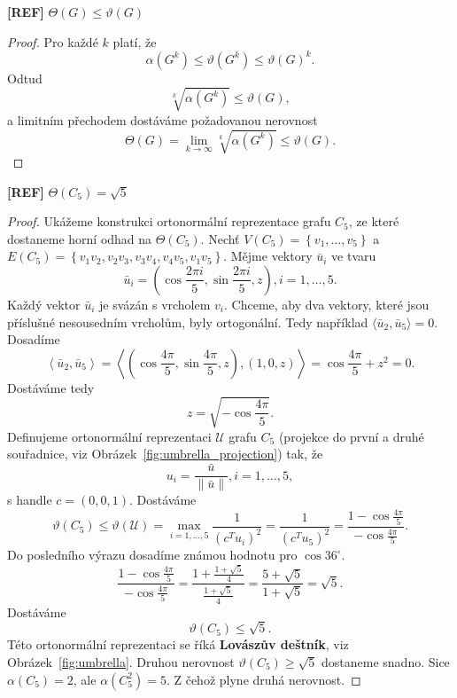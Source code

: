 \begin{lm}\textbf{[REF]}
    $\Theta(G) \leq \vartheta(G)$
\end{lm}

\begin{proof}
    Pro každé $k$ platí, že
    $$
        \alpha(G^k) \leq \vartheta(G^k) \leq \vartheta(G)^k.
    $$
    Odtud
    $$
        \sqrt[k]{\alpha(G^k)} \leq \vartheta(G),
    $$
    a limitním přechodem dostáváme požadovanou nerovnost
    $$
        \Theta(G) = \lim_{k \to \infty} \sqrt[k]{\alpha(G^k)} \leq \vartheta(G).
    $$
\end{proof}

\begin{vt}\textbf{[REF]}
    $\Theta(C_5) = \sqrt{5}$
\end{vt}

\begin{proof}
    Ukážeme konstrukci ortonormální reprezentace grafu $C_5$, ze které dostaneme horní odhad na $\Theta(C_5)$. Nechť $V(C_5) = \left\{ v_1, \dots, v_5 \right\}$ a $E(C_5) = \left\{ v_1v_2, v_2v_3, v_3v_4, v_4v_5, v_1v_5 \right\}$. Mějme vektory $\bar{u}_i$ ve tvaru
    $$
        \bar{u}_i = \left( \cos\frac{2 \pi i}{5}, \sin \frac{2 \pi i}{5}, z \right), i = 1, \dots, 5.
    $$
    Každý vektor $\bar{u}_i$ je svázán s vrcholem $v_i$. Chceme, aby dva vektory, které jsou příslušné nesousedním vrcholům, byly ortogonální. Tedy například $\langle \bar{u}_2, \bar{u}_5 \rangle = 0$. Dosadíme
    $$
        \left\langle \bar{u}_2, \bar{u}_5 \right\rangle = 
        \left\langle ( \cos\frac{4\pi}{5}, \sin\frac{4\pi}{5}, z ), \left( 1, 0, z \right) \right\rangle =
        \cos\frac{4\pi}{5} + z^2 = 0.
    $$
    Dostáváme tedy
    $$
        z = \sqrt{-\cos\frac{4\pi}{5}}.
    $$
    Definujeme ortonormální reprezentaci $\mathcal{U}$ grafu $C_5$ (projekce do první a druhé souřadnice, viz Obrázek~\ref{fig:umbrella_projection}) tak, že
    $$
        u_i = \frac{\bar{u}}{\| \bar{u} \|}, i = 1, \dots, 5,
    $$
    s handle $c = \left( 0, 0, 1 \right)$.
    Dostáváme
    $$
        \vartheta(C_5) \leq \vartheta(\mathcal{U}) = \max_{i = 1, \dots, 5} \frac{1}{(c^T u_i)^2} = \frac{1}{( c^T u_5)^2} = \frac{1 - \cos\frac{4\pi}{5}}{-\cos\frac{4\pi}{5}}.
    $$
    Do posledního výrazu dosadíme známou hodnotu pro $\cos 36^{\circ}$.
    $$
        \frac{1 - \cos\frac{4\pi}{5}}{-\cos\frac{4\pi}{5}} = \frac{1 + \frac{1 + \sqrt{5}}{4}}{\frac{1 + \sqrt{5}}{4}} = \frac{5 + \sqrt{5}}{1 + \sqrt{5}} = \sqrt{5}.
    $$
    Dostáváme
    $$
        \vartheta(C_5) \leq \sqrt{5}.
    $$
    Této ortonormální reprezentaci se říká \textbf{Lovászův deštník}, viz Obrázek~\ref{fig:umbrella}. Druhou nerovnost $\vartheta(C_5) \geq \sqrt{5}$ dostaneme snadno. Sice $\alpha(C_5) = 2$, ale $\alpha(C_5^2) = 5$. Z čehož plyne druhá nerovnost.
\end{proof}

